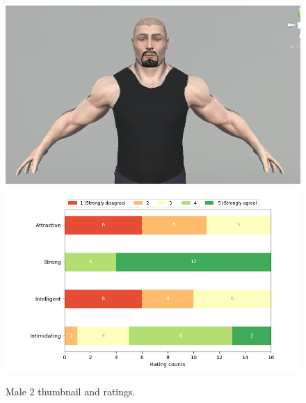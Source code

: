 \begin{figure}[H]
  \includegraphics[width=\linewidth]{Images/Males/2.JPG}
\endminipage\hfill
{}
  \includegraphics[width=\linewidth]{Survey/MRatings/avatar_m2.png}
\endminipage\hfill
\caption{Male 2 thumbnail and ratings.}
\end{figure}

